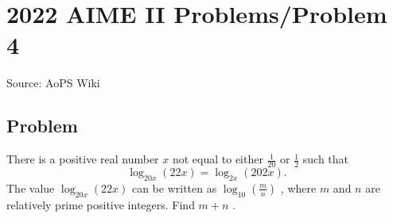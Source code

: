 \documentclass[12pt]{article}
\begin{document}
\section*{{2022 AIME II Problems/Problem 4}}
Source: AoPS Wiki

\subsection*{Problem}
There is a positive real number $x$ not equal to either $\tfrac{1}{20}$ or $\tfrac{1}{2}$ such that \[\log_{20x} (22x)=\log_{2x} (202x).\] The value $\log_{20x} (22x)$ can be written as $\log_{10} (\tfrac{m}{n})$ , where $m$ and $n$ are relatively prime positive integers. Find $m+n$ .
\end{document}
